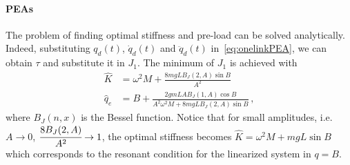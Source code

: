 \paragraph{PEAs} The problem of finding optimal stiffness and pre-load can be solved analytically. Indeed, substituting $q_d(t)$, $\dot q_d(t)$ and $\ddot q_d(t)$ in~\eqref{eq:onelinkPEA}, we can obtain $\tau$
and substitute it in $J_1$.
The minimum of $J_1$ is achieved with 
\[
\begin{aligned}
\hat K &= \omega^2 M+\frac{8mgLB_J(2,A)\sin B}{A^2}\\
\hat q_e &= B + \frac{2 g m L A B_J(1,A)\cos B}{A^2\omega^2 M+8mgLB_J(2,A)\sin B}\,,
\end{aligned}
\]
where $B_J(n,x)$ is the Bessel function. Notice that for small amplitudes, i.e.~$A\rightarrow 0$, $\cfrac{8B_J(2,A)}{A^2}\rightarrow 1$, the optimal stiffness becomes $\hat K=\omega^2 M+mgL\sin B$ which corresponds to the resonant condition for the linearized system in $q=B$. %


